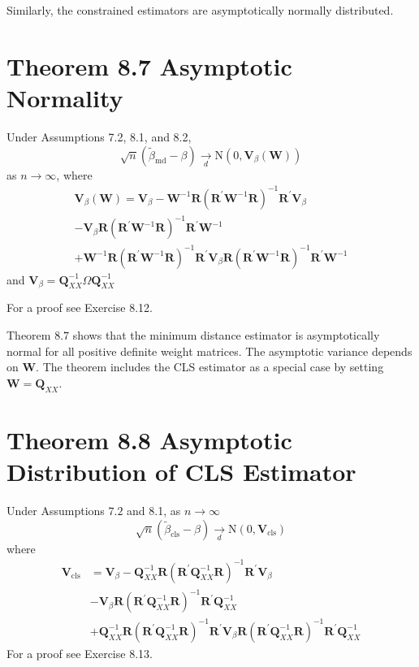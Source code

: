 \documentclass[10pt]{article}
\begin{document}
Similarly, the constrained estimators are asymptotically normally distributed.

\section{Theorem 8.7 Asymptotic Normality}
Under Assumptions 7.2, 8.1, and 8.2,
$$
\sqrt{n}\left(\widetilde{\beta}_{\mathrm{md}}-\beta\right) \underset{d}{\longrightarrow} \mathrm{N}\left(0, \boldsymbol{V}_{\beta}(\boldsymbol{W})\right)
$$
as $n \rightarrow \infty$, where
$$
\begin{gathered}
\boldsymbol{V}_{\beta}(\boldsymbol{W})=\boldsymbol{V}_{\beta}-\boldsymbol{W}^{-1} \boldsymbol{R}\left(\boldsymbol{R}^{\prime} \boldsymbol{W}^{-1} \boldsymbol{R}\right)^{-1} \boldsymbol{R}^{\prime} \boldsymbol{V}_{\beta} \\
-\boldsymbol{V}_{\beta} \boldsymbol{R}\left(\boldsymbol{R}^{\prime} \boldsymbol{W}^{-1} \boldsymbol{R}\right)^{-1} \boldsymbol{R}^{\prime} \boldsymbol{W}^{-1} \\
+\boldsymbol{W}^{-1} \boldsymbol{R}\left(\boldsymbol{R}^{\prime} \boldsymbol{W}^{-1} \boldsymbol{R}\right)^{-1} \boldsymbol{R}^{\prime} \boldsymbol{V}_{\beta} \boldsymbol{R}\left(\boldsymbol{R}^{\prime} \boldsymbol{W}^{-1} \boldsymbol{R}\right)^{-1} \boldsymbol{R}^{\prime} \boldsymbol{W}^{-1}
\end{gathered}
$$
and $\boldsymbol{V}_{\beta}=\boldsymbol{Q}_{X X}^{-1} \Omega \boldsymbol{Q}_{X X}^{-1}$

For a proof see Exercise 8.12.

Theorem $8.7$ shows that the minimum distance estimator is asymptotically normal for all positive definite weight matrices. The asymptotic variance depends on $\boldsymbol{W}$. The theorem includes the CLS estimator as a special case by setting $\boldsymbol{W}=\boldsymbol{Q}_{X X}$.

\section{Theorem 8.8 Asymptotic Distribution of CLS Estimator}
Under Assumptions $7.2$ and 8.1, as $n \rightarrow \infty$
$$
\sqrt{n}\left(\widetilde{\beta}_{\mathrm{cls}}-\beta\right) \underset{d}{\longrightarrow} \mathrm{N}\left(0, \boldsymbol{V}_{\mathrm{cls}}\right)
$$
where
$$
\begin{aligned}
\boldsymbol{V}_{\mathrm{cls}} &=\boldsymbol{V}_{\beta}-\boldsymbol{Q}_{X X}^{-1} \boldsymbol{R}\left(\boldsymbol{R}^{\prime} \boldsymbol{Q}_{X X}^{-1} \boldsymbol{R}\right)^{-1} \boldsymbol{R}^{\prime} \boldsymbol{V}_{\beta} \\
&-\boldsymbol{V}_{\beta} \boldsymbol{R}\left(\boldsymbol{R}^{\prime} \boldsymbol{Q}_{X X}^{-1} \boldsymbol{R}\right)^{-1} \boldsymbol{R}^{\prime} \boldsymbol{Q}_{X X}^{-1} \\
&+\boldsymbol{Q}_{X X}^{-1} \boldsymbol{R}\left(\boldsymbol{R}^{\prime} \boldsymbol{Q}_{X X}^{-1} \boldsymbol{R}\right)^{-1} \boldsymbol{R}^{\prime} \boldsymbol{V}_{\beta} \boldsymbol{R}\left(\boldsymbol{R}^{\prime} \boldsymbol{Q}_{X X}^{-1} \boldsymbol{R}\right)^{-1} \boldsymbol{R}^{\prime} \boldsymbol{Q}_{X X}^{-1}
\end{aligned}
$$
For a proof see Exercise 8.13.
\end{document}
